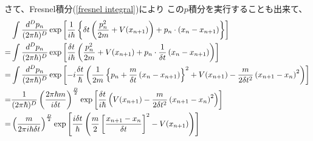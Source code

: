 さて、Fresnel積分(\ref{fresnel integral})により
この$p$積分を実行することも出来て、
\begin{align}
    &\int
    \dfrac{ d^D p_n }{ (2 \pi \hbar)^{D} }
    \exp\left[
        \dfrac{ 1 }{i\hbar}
        \left\{
            \delta t
            \left(
                \dfrac{ p^2_n }{ 2m }
            +
                V( x_{n+1} )
            \right)
            +
            p_n \cdot
            \left(
                x_{n}
                -
                x_{n+1}
            \right)
        \right\}
    \right]
\notag\\=
    &\int
    \dfrac{ d^D p_n }{ (2 \pi \hbar)^{D} }
    \exp\left[
        \dfrac{ \delta t }{i\hbar}
        \left(
            \dfrac{ p^2_n }{ 2m }
        +
            V( x_{n+1} )
        +
            p_n \cdot
            \dfrac{ 1 }{\delta t}
            \left(
                x_{n}
            -
                x_{n+1}
            \right)
        \right)
    \right]
\notag\\=
    &\int
    \dfrac{ d^D p_n }{ (2 \pi \hbar)^{D} }
    \exp\left[
        - i
        \dfrac{ \delta t }{\hbar}
        \left(
            \dfrac{ 1 }{ 2m }
            \left\{
                p_n
            +
                \dfrac{ m }{\delta t}
                \left(
                    x_{n}
                -
                    x_{n+1}
                \right)
            \right\}^2
        +
            V( x_{n+1} )
        -
            \dfrac{ m }{2 \delta t^2}
            \left(
                x_{n+1}
            -
                x_{n}
            \right)^2
        \right)
    \right]
\notag\\=
    &
    \dfrac{ 1 }{ (2 \pi \hbar)^{D} }
    \left(
        \dfrac{2 \pi \hbar m}{ i \delta t }
    \right)^{\frac{D}{2}}
    \exp\left[
        \dfrac{ \delta t }{i\hbar}
        \left(
            V( x_{n+1} )
            -
            \dfrac{ m }{2 \delta t^2}
            \left(
                x_{n+1}
            -
                x_{n}
            \right)^2                
        \right)
    \right]
\notag\\=
    &
    \left(
        \dfrac{m}{ 2 \pi i \hbar \delta t }
    \right)^{\frac{D}{2}}
    \exp\left[
        \dfrac{ i \delta t }{\hbar}
        \left(
            \dfrac{m}{2}
            \left[
                \dfrac{
                    x_{n+1}
                -
                    x_{n}    
                }{\delta t}
            \right]^2
        -
            V( x_{n+1} )
        \right)
    \right]
\end{align}
